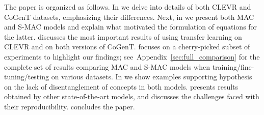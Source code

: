 The paper is organized as follows.
In  we delve into details of both CLEVR and CoGenT datasets, emphasizing their differences.
Next, in  we present both MAC and S-MAC models and explain what motivated the formulation of equations for the latter.
 discusses the most important results of using transfer learning 
on CLEVR and on both versions of CoGenT.
 focuses on a cherry-picked subset of experiments to highlight our findings; 
see~Appendix~\ref{sec:full_comparison} for the complete set of results comparing MAC and S-MAC models when training/fine-tuning/testing on various datasets.
In  we show examples supporting hypothesis on the lack of disentanglement of concepts in both models.
 presents results obtained by other state-of-the-art models, and discusses the challenges faced  
with their reproducibility. 
 concludes the paper.
